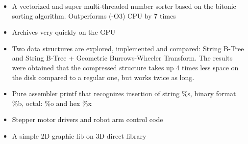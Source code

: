 \documentclass[10pt,a4paper]{altacv}
\begin{document}
\begin{itemize}
  \item \small{A vectorized and super multi-threaded number sorter based on the bitonic sorting algorithm. Outperforms (-O3) CPU by 7 times}
\end{itemize}
\divider

\begin{itemize}
  \item \small{Archives very quickly on the GPU}
\end{itemize}
\divider

\begin{itemize}
  \item \small{Two data structures are explored, implemented and compared: String B-Tree and String B-Tree + Geometric Burrows-Wheeler Transform. The results were obtained that the compressed structure takes up 4 times less space on the disk compared to a regular one, but works twice as long.}
\end{itemize}
\divider

\begin{itemize}
  \item \small{Pure assembler printf that recognizes insertion of string \%s, binary format \%b, octal: \%o and hex \%x}
\end{itemize}
\divider

\begin{itemize}
  \item \small{Stepper motor drivers and robot arm control code}
\end{itemize}
\divider

\begin{itemize}
  \item \small{A simple 2D graphic lib on 3D direct library}
\end{itemize}
\divider
\end{document}
